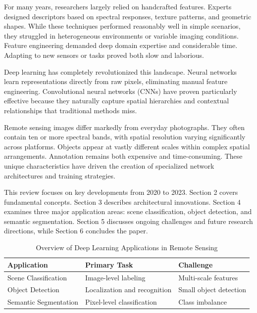 \documentclass[12pt,a4paper]{article}
\begin{document}
For many years, researchers largely relied on handcrafted features. Experts designed descriptors based on spectral responses, texture patterns, and geometric shapes. While these techniques performed reasonably well in simple scenarios, they struggled in heterogeneous environments or variable imaging conditions. Feature engineering demanded deep domain expertise and considerable time. Adapting to new sensors or tasks proved both slow and laborious.

Deep learning has completely revolutionized this landscape. Neural networks learn representations directly from raw pixels, eliminating manual feature engineering. Convolutional neural networks (CNNs) have proven particularly effective because they naturally capture spatial hierarchies and contextual relationships that traditional methods miss.

Remote sensing images differ markedly from everyday photographs. They often contain ten or more spectral bands, with spatial resolution varying significantly across platforms. Objects appear at vastly different scales within complex spatial arrangements. Annotation remains both expensive and time-consuming. These unique characteristics have driven the creation of specialized network architectures and training strategies.

This review focuses on key developments from 2020 to 2023. Section 2 covers fundamental concepts. Section 3 describes architectural innovations. Section 4 examines three major application areas: scene classification, object detection, and semantic segmentation. Section 5 discusses ongoing challenges and future research directions, while Section 6 concludes the paper.

\begin{table}[htbp]
\centering
\caption{Overview of Deep Learning Applications in Remote Sensing}
\label{tab:applications}
\begin{tabular}{@{}lll@{}}
\toprule
\textbf{Application} & \textbf{Primary Task} & \textbf{Challenge} \\
\midrule
Scene Classification & Image-level labeling & Multi-scale features \\
Object Detection & Localization and recognition & Small object detection \\
Semantic Segmentation & Pixel-level classification & Class imbalance \\
\bottomrule
\end{tabular}
\end{table}
\end{document}

